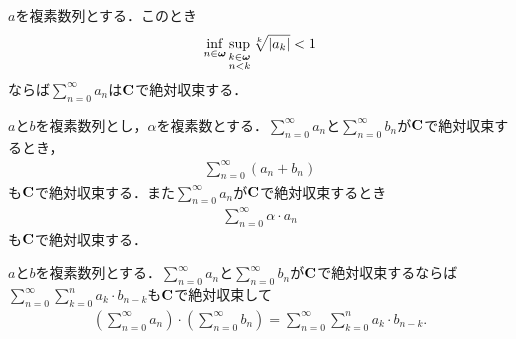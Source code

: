 	\begin{screen}
		\begin{thm}[Cauchyの冪根判定法]
			$a$を複素数列とする．このとき
			\begin{align}
				\operatorname*{inf}_{n \in {\boldsymbol \omega}} \operatorname*{sup}_{\substack{k \in {\boldsymbol \omega} \\ n < k}} \sqrt[k]{|a_k|} < 1
				\label{fom:Cauchy_root_test_1}
			\end{align}
			ならば$\sum_{n=0}^\infty a_n$は$\mathbf{C}$で絶対収束する．
		\end{thm}
	\end{screen}
	
	\begin{sketch}
		
	\end{sketch}
	
	\begin{screen}
		\begin{thm}[絶対収束する数列の和とスケール変換も絶対収束する]
			$a$と$b$を複素数列とし，$\alpha$を複素数とする．$\sum_{n=0}^\infty a_n$と$\sum_{n=0}^\infty b_n$が$\mathbf{C}$で絶対収束するとき，
			\begin{align}
				\sum_{n=0}^\infty (a_n + b_n)
			\end{align}
			も$\mathbf{C}$で絶対収束する．また$\sum_{n=0}^\infty a_n$が$\mathbf{C}$で絶対収束するとき
			\begin{align}
				\sum_{n=0}^\infty \alpha \cdot a_n
			\end{align}
			も$\mathbf{C}$で絶対収束する．
		\end{thm}
	\end{screen}
	
	\begin{sketch}
	\end{sketch}
	
	\begin{screen}
		\begin{thm}[絶対収束級数の畳み込み]\label{thm:convolution_of_absolutely_convergent_series}
			$a$と$b$を複素数列とする．$\sum_{n=0}^\infty a_n$と$\sum_{n=0}^\infty b_n$が$\mathbf{C}$で絶対収束するならば
			$\sum_{n=0}^\infty \sum_{k=0}^n a_k \cdot b_{n-k}$も$\mathbf{C}$で絶対収束して
			\begin{align}
				\left(\sum_{n=0}^\infty a_n\right) \cdot \left(\sum_{n=0}^\infty b_n\right)
				= \sum_{n=0}^\infty \sum_{k=0}^n a_k \cdot b_{n-k}.
			\end{align}
		\end{thm}
	\end{screen}
	
	\begin{sketch}
	\end{sketch}
	
